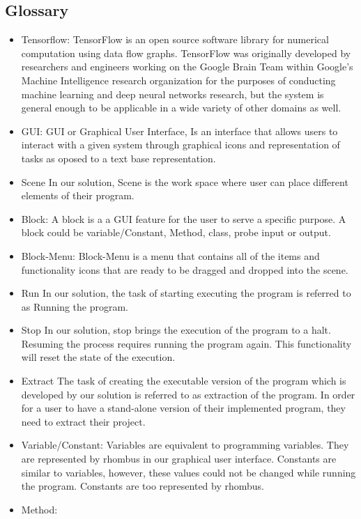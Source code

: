 \documentclass[journal,10pt,onecolumn,compsoc]{IEEEtran} \usepackage[margin=1.0in]{geometry} \usepackage{pdfpages} \usepackage{graphicx}
\begin{document}
\subsection{Glossary}
\begin{itemize}
	\item Tensorflow:
		TensorFlow is an open source software library for numerical computation using data flow graphs.
		TensorFlow was originally developed by researchers and engineers working on the Google Brain Team within
		Google's Machine Intelligence research organization for the purposes of conducting machine learning and 
		deep neural networks research, but the system is general enough to be applicable in a wide variety of other domains as well.
	\item GUI:
		GUI or Graphical User Interface, Is an interface that allows users to interact with a given system through graphical icons and representation of tasks as oposed to a text base representation.
	\item Scene
		In our solution, Scene is the work space where user can place different elements of their program.
	\item Block:
		A block is a a GUI feature for the user to serve a specific purpose. A block could be variable/Constant, Method, class, probe input or output.
	\item Block-Menu:
		Block-Menu is a menu that contains all of the items and functionality icons that are ready to be dragged and dropped into the scene.
	\item Run
		In our solution, the task of starting executing the program is referred to as Running the program.
	\item Stop
		In our solution, stop brings the execution of the program to a halt. Resuming the process requires running the program again.
		This functionality will reset the state of the execution.
	\item Extract
		The task of creating the executable version of the program which is developed by our solution is referred to as extraction of the program.
		In order for a user to have a stand-alone version of their implemented program, they need to extract their project.
	\item Variable/Constant:
		Variables are equivalent to programming variables. They are represented by rhombus in our graphical user interface.
		Constants are similar to  variables, however, these values could not be changed while running the program.
		Constants are too represented by rhombus.
	\item Method:

\end{itemize}
\end{document}
